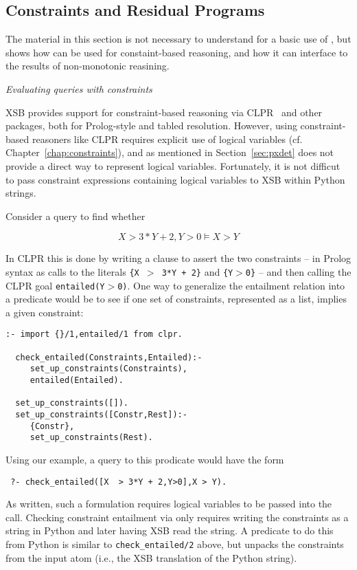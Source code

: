 \subsection{Constraints and Residual Programs} 

The material in this section is not necessary to understand for a
basic use of \px{}, but shows how \px{} can be used for
constaint-based reasoning, and how it can interface to the results of
non-monotonic reasining.

\begin{example} \rm {\it Evaluating queries with constraints} \label{ex:connstraints}

  XSB provides support for constraint-based reasoning via
  CLPR~\cite{Holz95} and other packages, both for Prolog-style and
  tabled resolution.  However, using constraint-based reasoners like
  CLPR requires explicit use of logical variables
  (cf. Chapter~\ref{chap:constraints}), and as mentioned in
  Section~\ref{sec:pxdet} \px{} does not provide a direct way to
  represent logical variables.  Fortunately, it is not difficut to
  pass constraint expressions containing logical variables to XSB
  within Python strings.

  Consider a query to find whether 

  \[X  > 3*Y + 2,Y>0 \models X > Y\]

\noindent  
  In CLPR this is done by writing a clause to assert the two
  constraints -- in Prolog syntax as calls to the literals {\tt \{X
    $>$ 3*Y + 2\}} and {\tt \{Y$>$0\}} -- and then calling the CLPR
  goal {\tt entailed(Y$>$0)}.  One way to generalize the entailment
  relation into a predicate would be to see if one set of constraints,
  represented as a list, implies a given constraint:

{\small  
\begin{verbatim}  
:- import {}/1,entailed/1 from clpr.

  check_entailed(Constraints,Entailed):- 
     set_up_constraints(Constraints),
     entailed(Entailed).

  set_up_constraints([]).
  set_up_constraints([Constr,Rest]):- 
     {Constr},
     set_up_constraints(Rest).
\end{verbatim}
}
\noindent
Using our example, a query to this prodicate would have the form

\begin{verbatim}
 ?- check_entailed([X  > 3*Y + 2,Y>0],X > Y).
\end{verbatim}
\noindent
As written, such a formulation requires logical variables to be passed
into the call.  Checking constraint entailment via \px{} only requires
writing the constraints as a string in Python and later having XSB
read the string.  A predicate to do this from Python is similar to
{\tt check\_entailed/2} above, but unpacks the constraints from the
input atom (i.e., the XSB translation of the Python string).


\end{example}
